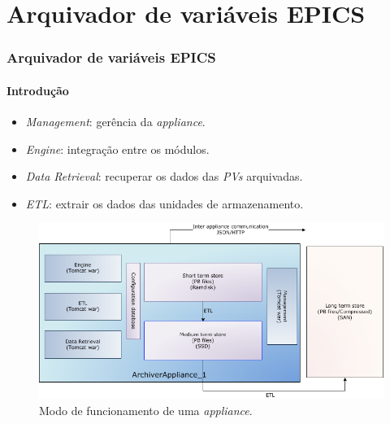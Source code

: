 \section {Arquivador de variáveis EPICS}

\begin{frame}
\frametitle {Arquivador de variáveis EPICS}
\framesubtitle{Introdução} 

\begin{itemize}
  \item \textit{Management}: gerência da \textit{appliance}.
  \item \textit{Engine}: integração entre os módulos.
  \item \textit{Data Retrieval}: recuperar os dados das \textit{PVs} arquivadas.
  \item \textit{ETL}: extrair os dados das unidades de armazenamento.

\end{itemize}

\begin{figure}[h]

    \centering
    \includegraphics[scale=0.3]{image/applarch}
    \caption {Modo de funcionamento de uma \textit{appliance}.}
    \label{fig:epics_archiver}
\end{figure}

\end{frame}


